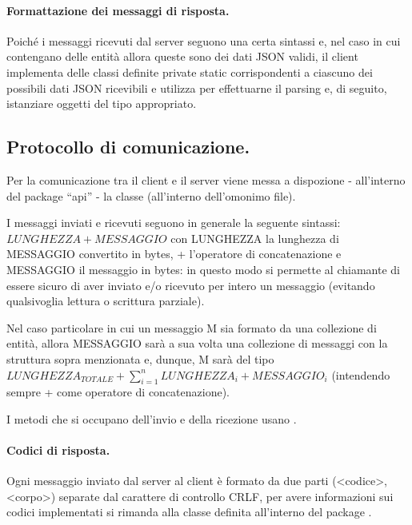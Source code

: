 \documentclass[11pt, italian, openany]{book}
\begin{document}
\begin{sloppypar}
\paragraph*{Formattazione dei messaggi di risposta.}
Poich\'e i messaggi ricevuti dal server seguono una certa sintassi e, nel caso in cui contengano delle entit\`a allora queste sono dei
dati JSON validi, il client implementa delle classi definite private static corrispondenti a ciascuno dei possibili dati JSON
ricevibili e utilizza  per effettuarne il parsing
e, di seguito, istanziare oggetti del tipo appropriato.

\subsection{Protocollo di comunicazione.}
Per la comunicazione tra il client e il server viene messa a dispozione - all'interno del package ``api'' - la classe 
(all'interno dell'omonimo file).

I messaggi inviati e ricevuti seguono in generale la seguente sintassi: \(LUNGHEZZA+MESSAGGIO\) con LUNGHEZZA la lunghezza di MESSAGGIO
convertito in bytes, + l'operatore di concatenazione e MESSAGGIO il messaggio in bytes: in questo modo si permette al chiamante di essere
sicuro di aver inviato e/o ricevuto per intero un messaggio (evitando qualsivoglia lettura o scrittura parziale).

Nel caso particolare in cui un messaggio M sia formato da una collezione di entit\`a, allora MESSAGGIO sar\`a a sua volta una collezione
di messaggi con la struttura sopra menzionata e, dunque, M sar\`a del tipo
\(LUNGHEZZA_{TOTALE}+\displaystyle\sum_{i=1}^{n}LUNGHEZZA_{i}+MESSAGGIO_{i}\) (intendendo sempre + come operatore di concatenazione).

I metodi che si occupano dell'invio e della ricezione usano .

\paragraph*{Codici di risposta.}
Ogni messaggio inviato dal server al client \`e formato da due parti (<codice>, <corpo>) separate dal carattere di controllo CRLF, per
avere informazioni sui codici implementati si rimanda alla classe  definita all'interno del package .

\end{sloppypar}
\end{document}
